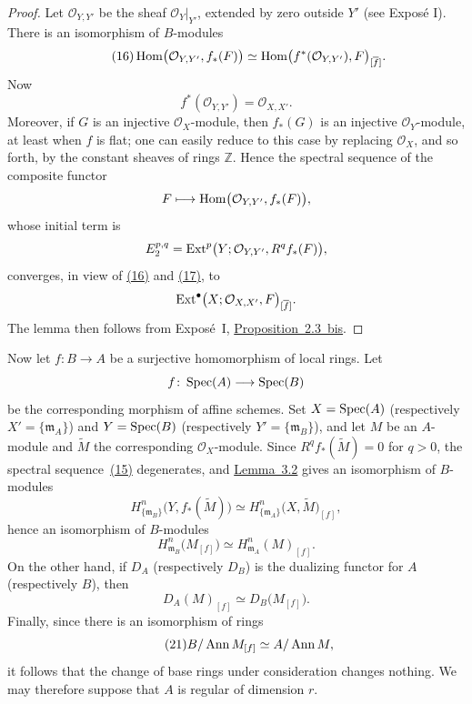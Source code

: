 \begin{proof}
Let $\mathcal O_{Y,Y'}$ be the sheaf
$\mathcal O_Y\vert_{Y'}$, extended by zero outside $Y'$ (see Expos\'e I).
There is an isomorphism of $B$-modules
\begin{equation}\tag{16}\label{eq:V.16}
  \operatorname{Hom}\bigl(\mathcal O_{Y,Y'},f_*(F)\bigr)
  \simeq
  \operatorname{Hom}\bigl(f^*(\mathcal O_{Y,Y'}),F\bigr)_{[\overline f]}.
\end{equation}
Now
\begin{equation}\tag{17}\label{eq:V.17}
  f^*(\mathcal O_{Y,Y'})=\mathcal O_{X,X'}.
\end{equation}
Moreover, if $G$ is an injective $\mathcal O_X$-module, then $f_*(G)$ is an
injective $\mathcal O_Y$-module, at least when $f$ is flat; one can easily
reduce to this case by replacing $\mathcal O_X$, and so forth, by the constant
sheaves of rings $\mathbb Z$. Hence the spectral sequence of the composite
functor
\[
  F\longmapsto\operatorname{Hom}\bigl(\mathcal O_{Y,Y'},f_*(F)\bigr),
\]
whose initial term is
\[
  E_2^{p,q}=\operatorname{Ext}^p\bigl(Y;\mathcal O_{Y,Y'},R^q f_*(F)\bigr),
\]
converges, in view of \textup{\hyperref[eq:V.16]{(16)}} and \textup{\hyperref[eq:V.17]{(17)}}, to
\[
  \operatorname{Ext}^{\bullet}\bigl(X;\mathcal O_{X,X'},F\bigr)_{[\overline f]}.
\]
The lemma then follows from Expos\'e~I,
\hyperref[I.2.3bof]{Proposition~2.3~bis}.
\end{proof}

Now let $f\colon B\to A$ be a surjective homomorphism of local rings. Let
\[
  f\colon \operatorname{Spec}(A)\longrightarrow\operatorname{Spec}(B)
\]
be the corresponding morphism of affine schemes. Set
$X=\operatorname{Spec}(A)$ (respectively $X'=\{\mathfrak m_A\}$) and
$Y=\operatorname{Spec}(B)$ (respectively $Y'=\{\mathfrak m_B\}$), and let $M$ be an
$A$-module and $\widetilde M$ the corresponding $\mathcal O_X$-module. Since
$R^qf_*(\widetilde M)=0$ for $q>0$, the spectral sequence~\textup{\hyperref[eq:V.15]{(15)}}
degenerates, and \hyperref[V.3.2]{Lemma~3.2} gives an isomorphism of $B$-modules
\begin{equation}\tag{18}\label{eq:V.18}
  H_{\{\mathfrak m_B\}}^n\bigl(Y,f_*(\widetilde M)\bigr)
  \simeq
  H_{\{\mathfrak m_A\}}^n\bigl(X,\widetilde M\bigr)_{[f]},
\end{equation}
hence an isomorphism of $B$-modules
\begin{equation}\tag{19}\label{eq:V.19}
  H_{\mathfrak m_B}^n\bigl(M_{[f]}\bigr)
  \simeq
  H_{\mathfrak m_A}^n(M)_{[f]}.
\end{equation}
On the other hand, if $D_A$ (respectively $D_B$) is the dualizing functor for
$A$ (respectively $B$), then
\begin{equation}\tag{20}\label{eq:V.20}
  D_A(M)_{[f]}\simeq D_B\bigl(M_{[f]}\bigr).
\end{equation}
Finally, since there is an isomorphism of rings
\begin{equation}\tag{21}\label{eq:V.21}
  B/\operatorname{Ann} M_{[f]}\simeq A/\operatorname{Ann} M,
\end{equation}
it follows that the change of base rings under consideration changes
nothing. We may therefore suppose that $A$ is regular of dimension $r$.

